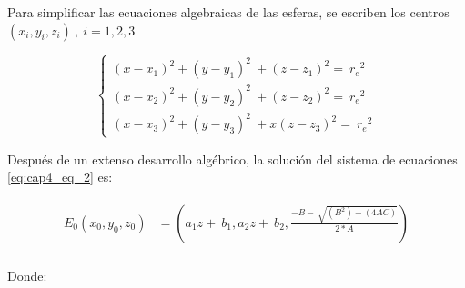     \vspace{-3.5em}

    Para simplificar las ecuaciones algebraicas de las esferas, se escriben los centros $\left(x_i,y_i,z_i\right)\ ,\ i=1,2,3$
    
        \vspace{-1em}

    
    \begin{equation}
    \left\lbrace
    \begin{array}{ll}
    {\left(x-x_1\right)}^2+{\left(y-y_1\right)}^2\ +{\left(z-z_1\right)}^2=\ {r_e}^2\  \\ 
    {\left(x-x_2\right)}^2+{\left(y-y_2\right)}^2\ +{\left(z-z_2\right)}^2=\ {r_e}^2 \\ 
    {\left(x-x_3\right)}^2+{\left(y-y_3\right)}^2\ +{x\left(z-z_3\right)}^2=\ {r_e}^2
    \end{array}
    \right.
    \label{eq:cap4_eq_2}
    \end{equation}


    Despu\'{e}s de un extenso desarrollo alg\'{e}brico, la soluci\'{o}n del sistema de ecuaciones \ref{eq:cap4_eq_2} es:

    \vspace{-2.5em}

    \begin{align}
    \begin{split}
            E_0\left(x_0,y_0,z_0\right)&={} \left(a_1z+\ b_1,a_2z+\ b_2,\frac{-B-\ \sqrt{\left(B^2\right)-\left(4AC\right)}}{2*A}\right)\\
    \end{split}
    \label{eq:cap4_eq_3}
    \end{align}
    

    Donde:
    \vspace{-1.0em}
        
